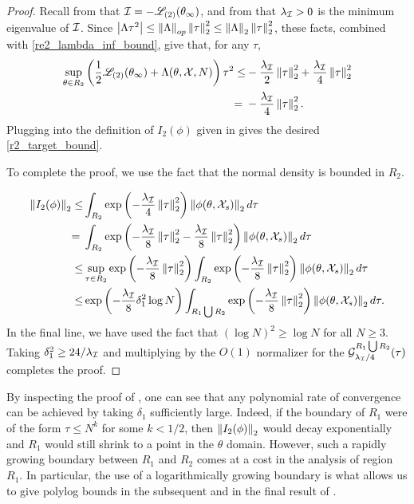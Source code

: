 \begin{proof}
Recall from  that $\mathcal{I} =
-\mathscr{L}_{(2)}(\theta_{\infty})$, and from  that
$\lambda_\mathcal{I} > 0$ is the minimum eigenvalue of $\mathcal{I}$.  Since $\left\vert \Lambda \tau^2\right\vert
\le \left\Vert \Lambda\right\Vert_{op} \left\Vert \tau\right\Vert_2^2 \le \left\Vert \Lambda\right\Vert_2 \left\Vert \tau\right\Vert_2^2$,
these facts, combined with \eqref{re2_lambda_inf_bound}, give that, for any
$\tau$,
%
\begin{align*}
%
\sup_{\theta \in R_2}
\left(\frac{1}{2}\likk{2}(\thetatrue) + \Lambda(\theta, \xvec, N)\right) \tau^2
    \le& -\frac{\infoev}{2} \norm{\tau}_2^2 + \frac{\infoev}{4} \norm{\tau}_2^2 \\
    ={}& -\frac{\infoev}{4} \norm{\tau}_2^2.
%
\end{align*}
%
Plugging into the definition of $I_2(\phi)$ given in 
gives the desired \eqref{r2_target_bound}.

To complete the proof, we use the fact that the normal density is bounded
in $R_2$.

\begin{align*}
%
\norm{I_2(\phi)}_2
\le&
\int_{R_2}
    \exp\left(
        -\frac{\infoev}{4} \norm{\tau}_2^2
        \right) \norm{\phi(\theta, \xvec_s)}_2  d\tau
\\={}&
\int_{R_2}
    \exp\left(
        -\frac{\infoev}{8} \norm{\tau}_2^2
        -\frac{\infoev}{8} \norm{\tau}_2^2
        \right) \norm{\phi(\theta, \xvec_s)}_2 d\tau
\\\le&
\sup_{\tau \in R_2}
\exp\left(
    -\frac{\infoev}{8} \norm{\tau}_2^2
\right)
\int_{R_2}
    \exp\left(
        -\frac{\infoev}{8} \norm{\tau}_2^2
        \right) \norm{\phi(\theta, \xvec_s)}_2 d\tau
\\\le &
\exp\left(
    -\frac{\infoev}{8} \delta_1^2 \log N
\right)
\int_{R_1 \bigcup R_2}
    \exp\left(
        -\frac{\infoev}{8} \norm{\tau}_2^2
        \right) \norm{\phi(\theta, \xvec_s)}_2 d\tau.
%
\end{align*}
%
In the final line, we have used the fact that $(\log N)^2 \ge \log N$ for all $N
\ge 3$. Taking $\delta_1^2 \ge 24 / \lambda_\mathcal{I}$ and multiplying by the $O(1)$
normalizer for the $\mathcal{G}_{\lambda_\mathcal{I}/4}^{R_1 \bigcup R_2}(\tau)$ completes the proof.
%
\end{proof} %

By inspecting the proof of , one can see that any
polynomial rate of convergence can be achieved by taking $\delta_1$ sufficiently
large. Indeed, if the boundary of $R_1$ were of the form $\tau \le
N^k$ for some $k < 1/2$, then $\left\Vert I_2(\phi)\right\Vert_2$ would decay exponentially and
$R_1$ would still shrink to a point in the $\theta$ domain.  However, such a
rapidly growing boundary between $R_1$ and $R_2$ comes at a cost in the analysis
of region $R_1$.  In particular, the use of a logarithmically growing
boundary is what allows us to give polylog bounds in the subsequent
 and in the final result of
.
